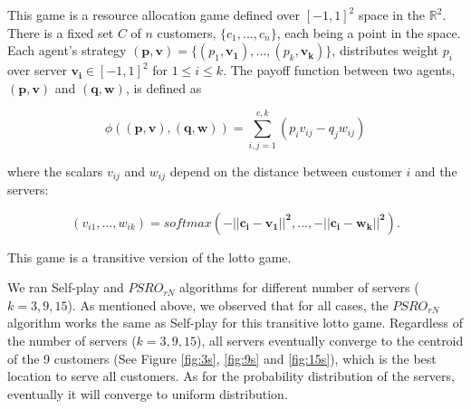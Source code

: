 \documentclass{article}
\begin{document}
This game is a resource allocation game defined over $[-1,1]^2$ space in the $\mathbb{R}^2$. There is a fixed set $C$ of $n$ customers, $\{c_1,...,c_n\}$, each being a point in the space. Each agent's strategy $(\mathbf{p},\mathbf{v}) = \{(p_1,\mathbf{v_1}),...,(p_k,\mathbf{v_k})\}$, distributes weight $p_i$ over server $\mathbf{v_i} \in [-1,1]^2$ for $1 \leq i \leq k$. The payoff function between two agents, $\mathbf{(p,v)}$ and $\mathbf{(q,w)}$, is defined as

$$\phi(\mathbf{(p,v),(q,w)}) = \sum_{i,j=1}^{c,k}(p_i v_{ij}-q_j w_{ij})$$

where the scalars $v_{ij}$ and $w_{ij}$ depend on the distance between customer $i$ and the servers:

$$(v_{i1},...,w_{ik}) = softmax(\mathbf{-||c_i-v_1||^2,...,-||c_i-w_k||^2}).$$

This game is a transitive version of the lotto game.

We ran Self-play and $PSRO_{rN}$ algorithms for different number of servers ($k=3,9,15$). As mentioned above, we observed that for all cases, the $PSRO_{rN}$ algorithm works the same as Self-play for this transitive lotto game. Regardless of the number of servers ($k=3,9,15$), all servers eventually converge to the centroid of the 9 customers (See Figure \ref{fig:3s}, \ref{fig:9s} and \ref{fig:15s}), which is the best location to serve all customers. As for the probability distribution of the servers, eventually it will converge to uniform distribution.
\end{document}
